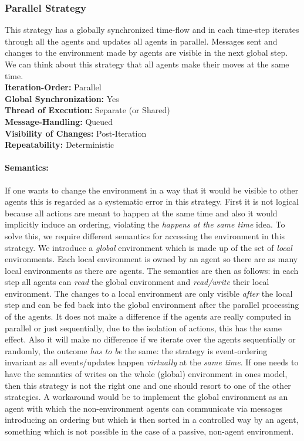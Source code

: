 \subsubsection{Parallel Strategy}
This strategy has a globally synchronized time-flow and in each time-step iterates through all the agents and updates all agents in parallel. Messages sent and changes to the environment made by agents are visible in the next global step. We can think about this strategy that all agents make their moves at the same time. \\

\textbf{Iteration-Order:} Parallel \\
\textbf{Global Synchronization:} Yes \\
\textbf{Thread of Execution:} Separate (or Shared) \\
\textbf{Message-Handling:} Queued \\
\textbf{Visibility of Changes:}	Post-Iteration \\
\textbf{Repeatability:}	Deterministic 

\paragraph{Semantics:} If one wants to change the environment in a way that it would be visible to other agents this is regarded as a systematic error in this strategy. First it is not logical because all actions are meant to happen at the same time and also it would implicitly induce an ordering, violating the \textit{happens at the same time} idea. To solve this, we require different semantics for accessing the environment in this strategy. We introduce a \textit{global} environment which is made up of the set of \textit{local} environments. Each local environment is owned by an agent so there are as many local environments as there are agents. The semantics are then as follows: in each step all agents can \textit{read} the global environment and \textit{read/write} their local environment. The changes to a local environment are only visible \textit{after} the local step and can be fed back into the global environment after the parallel processing of the agents. 
It does not make a difference if the agents are really computed in parallel or just sequentially, due to the isolation of actions, this has the same effect. Also it will make no difference if we iterate over the agents sequentially or randomly, the outcome \textit{has to be} the same: the strategy is event-ordering invariant as all events/updates happen \textit{virtually} at the \textit{same time}. If one needs to have the semantics of writes on the whole (global) environment in ones model, then this strategy is not the right one and one should resort to one of the other strategies. A workaround would be to implement the global environment as an agent with which the non-environment agents can communicate via messages introducing an ordering but which is then sorted in a controlled way by an agent, something which is not possible in the case of a passive, non-agent environment.

